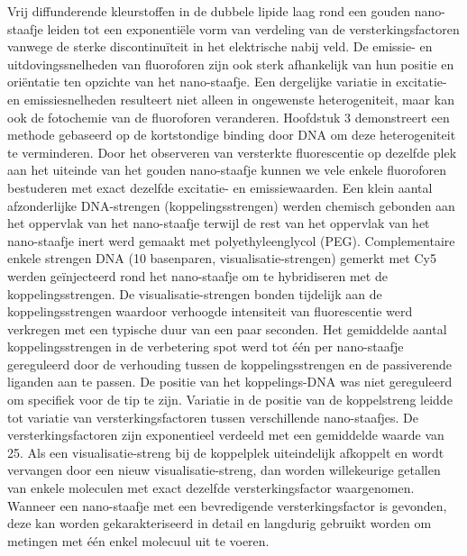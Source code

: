 Vrij diffunderende kleurstoffen in de dubbele lipide laag rond een gouden nano-staafje leiden tot een exponentiële vorm van verdeling van de versterkingsfactoren vanwege de sterke discontinuïteit in het elektrische nabij veld. De emissie- en uitdovingssnelheden van fluoroforen zijn ook sterk afhankelijk van hun positie en oriëntatie ten opzichte van het nano-staafje. Een dergelijke variatie in excitatie- en emissiesnelheden resulteert niet alleen in ongewenste heterogeniteit, maar kan ook de fotochemie van de fluoroforen veranderen. Hoofdstuk 3 demonstreert een methode gebaseerd op de kortstondige binding door DNA om deze heterogeniteit te verminderen. Door het observeren van versterkte fluorescentie op dezelfde plek aan het uiteinde van het gouden nano-staafje kunnen we vele enkele fluoroforen bestuderen met
exact dezelfde excitatie- en emissiewaarden. Een klein aantal afzonderlijke DNA-strengen
(koppelingsstrengen) werden chemisch gebonden aan het oppervlak van het nano-staafje terwijl de rest van het oppervlak van het nano-staafje inert werd gemaakt met polyethyleenglycol (PEG). Complementaire enkele strengen DNA (10 basenparen, visualisatie-strengen) gemerkt met Cy5 werden geïnjecteerd rond het nano-staafje om te hybridiseren met de koppelingsstrengen. De visualisatie-strengen bonden tijdelijk aan de koppelingsstrengen waardoor verhoogde intensiteit  van fluorescentie werd verkregen met een typische duur van een paar seconden. Het gemiddelde aantal koppelingsstrengen in de verbetering spot werd tot één per nano-staafje gereguleerd door de verhouding tussen de koppelingsstrengen en de passiverende liganden aan te passen. De positie van het koppelings-DNA was niet gereguleerd om specifiek voor de tip te zijn. Variatie in de positie van de koppelstreng leidde tot variatie van versterkingsfactoren tussen verschillende nano-staafjes. De versterkingsfactoren zijn exponentieel verdeeld met een gemiddelde waarde van 25. Als een visualisatie-streng bij de koppelplek uiteindelijk afkoppelt en wordt vervangen door een nieuw visualisatie-streng, dan worden willekeurige getallen van enkele moleculen met exact dezelfde versterkingsfactor waargenomen. Wanneer een nano-staafje met een bevredigende versterkingsfactor is gevonden, deze kan worden gekarakteriseerd in detail en langdurig gebruikt worden om metingen met één enkel molecuul uit te voeren.


